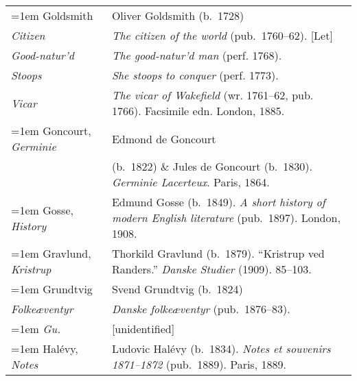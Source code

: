 \begin{xltabular}{\textwidth}{ lQ }
\hangindent=1em  Goldsmith & Oliver Goldsmith (b.~1728) \\
\hspace{1em}\textit{Citizen} & \textit{The citizen of the world} (pub.~1760--62). [Let] \\
\hspace{1em}\textit{Good-natur'd} & \textit{The good-natur'd man} (perf. 1768). \\
\hspace{1em}\textit{Stoops} & \textit{She stoops to conquer} (perf. 1773). \\
\hspace{1em}\textit{Vicar} & \textit{The vicar of Wakefield} (wr. 1761--62, pub. 1766). Facsimile edn. London, 1885. \\

\hangindent=1em  Goncourt, \textit{Germinie} & Edmond de Goncourt\\&(b.~1822) \& Jules de Goncourt (b.~1830). \textit{Germinie Lacerteux}. Paris, 1864. \\ %

\hangindent=1em  Gosse, \textit{History} & Edmund Gosse (b.~1849). \textit{A short history of modern English literature} (pub.~1897). London, 1908. \\

\hangindent=1em  Gravlund, \textit{Kristrup} & Thorkild Gravlund (b.~1879). ``Kristrup ved Randers.'' \textit{Danske Studier} (1909). 85--103. \\ %

\pagebreak
\hangindent=1em  Grundtvig & Svend Grundtvig (b.~1824)\\
\hspace{1em}\textit{Folkeæventyr} & \textit{Danske folkeæventyr} (pub.~1876–83). \\

\hangindent=1em  \textit{Gu.} & [unidentified] \\ %

\hangindent=1em  Halévy, \textit{Notes} & Ludovic Halévy (b.~1834). \textit{Notes et souvenirs 1871--1872} (pub.~1889). Paris, 1889. \\


\end{xltabular}
